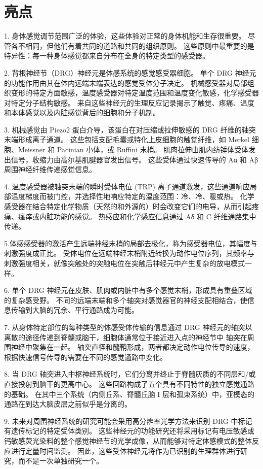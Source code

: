 \section{亮点}


1. 身体感觉调节范围广泛的体验，这些体验对正常的身体机能和生存很重要。 
尽管各不相同，但他们有着共同的道路和共同的组织原则。 
这些原则中最重要的是特异性：每一种身体感觉都来自分布在全身的特定类型的感受器。 


2. 背根神经节（DRG）神经元是体感系统的感觉感受器细胞。 
单个 DRG 神经元的功能作用由其在体内远端末端表达的感觉受体分子决定。 
机械感受器对局部组织变形的特定方面敏感，温度感受器对特定温度范围和温度变化敏感，化学感受器对特定分子结构敏感。 
来自这些神经元的生理反应记录揭示了触觉、疼痛、温度和本体感觉以及内脏感觉背后的细胞和分子机制。 


3. 机械感觉由 Piezo2 蛋白介导，该蛋白在对压缩或拉伸敏感的 DRG 纤维的轴突末端形成离子通道。 
这些包括支配毛囊或特化上皮细胞的触觉纤维，如 Merkel 细胞、Meissner 和 Pacinian 小体，或 Ruffini 末梢。 
肌肉拉伸由肌内纺锤体受体发出信号，收缩力由高尔基肌腱器官发出信号。 
这些受体通过快速传导的 Aα 和 Aβ 周围神经纤维传递感觉信息。 


4. 温度感受器被轴突末端的瞬时受体电位 (TRP) 离子通道激发，这些通道响应局部温度梯度而被门控，并选择性地响应特定的温度范围：冷、冷、暖或热。 
化学感受器在结合特定化学物质（天然的和外源的）时会改变它们的电导，从而引起疼痛、瘙痒或内脏功能的感觉。 热感应和化学感应信息通过 Aδ 和 C 纤维通路集中传递。 


5.体感感受器的激活产生远端神经末梢的局部去极化，称为感受器电位，其幅度与刺激强度成正比。 
受体电位在远端神经末梢附近转换为动作电位序列，其频率与刺激强度相关，就像突触处的突触电位在突触后神经元中产生复杂的放电模式一样。 


6. 单个 DRG 神经元在皮肤、肌肉或内脏中有多个感觉末梢，形成具有重叠区域的复杂感受野。 
不同的远端末端和多个轴突对感觉器官的神经支配相结合，使信息传输到大脑的冗余、平行通路成为可能。 


7. 从身体特定部位的每种类型的体感受体传输的信息通过 DRG 神经元的轴突以离散的途径传递到脊髓或脑干，细胞体通常位于接近进入点的神经节中 轴突在周围神经中聚集在一起。 
轴突直径和髓鞘形成，两者都决定动作电位传导的速度，根据快速信号传导的需要在不同的感觉通路中变化。 


8. 当 DRG 轴突进入中枢神经系统时，它们分离并终止于脊髓灰质的不同层和/或直接投射到脑干的更高中心。 
这些回路构成了五个具有不同特性的独立感觉通路的基础。 
在其中三个系统（内侧丘系、脊髓丘脑 I 层和孤束系统）中，亚模态的通路在到达大脑皮层之前似乎是分离的。 


9. 未来对周围神经系统的研究可能会采用高分辨率光学方法来识别 DRG 中标记有遗传标记的特定受体类别。 
这些神经元的功能研究还将采用标记有电压敏感或钙敏感荧光染料的整个感觉神经节的光学成像，从而能够对特定体感模式的整体反应进行定量时间监测。 
因此，这些受体神经元将作为已识别的生理群体进行研究，而不是一次单独研究一个。


%
